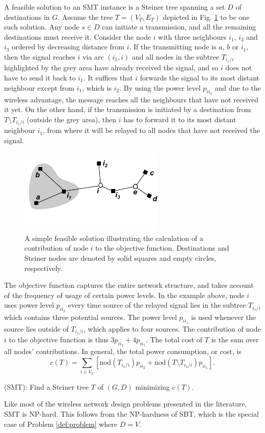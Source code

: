 A feasible solution to an SMT instance is a Steiner tree spanning a set $D$ of destinations in $G$. Assume the tree $T=(V_T, E_T)$ depicted in Fig. \ref{fig:objexp} to be one such solution. Any node $s\in D$ can initiate a transmission, and all the remaining destinations must receive it. Consider the node $i$ with three neighbours $i_1$, $i_2$ and $i_3$ ordered by decreasing distance from $i$. If the transmitting node is $a$, $b$ or $i_1$, then the signal reaches $i$ via arc $(i_1,i)$ and all nodes in the subtree $T_{i_1/i}$ highlighted by the grey area have already received the signal, and so $i$ does not have to send it back to $i_1$. It suffices that $i$ forwards the signal to its most distant neighbour except from $i_1$, which is $i_2$. By using the power level $p_{ii_2}$ and due to the wireless advantage, the message reaches all the neighbours that have not received it yet. On the other hand, if the transmission is initiated by a destination from $T\setminus T_{i_1/i}$ (outside the grey area), then $i$ has to forward it to its most distant neighbour $i_1$, from where it will be relayed to all nodes that have not received the signal.
\begin{figure}[h!]
        \centering
        \includegraphics[height=1.6in]{objexp}
        \caption{A simple feasible solution illustrating the calculation of a contribution of node $i$ to the objective function. Destinations and Steiner nodes are denoted by solid squares and empty circles, respectively.}
                \label{fig:objexp}
\end{figure}

 The objective function captures the entire network structure, and takes account of the  frequency of usage of certain power levels. In the example above, node $i$ uses power level $p_{ii_2}$ every time source of the relayed signal lies in the subtree $T_{i_1/i}$ which contains three potential sources. The power level $p_{ii_1}$ is used  whenever the source lies outside of $T_{i_1/i}$, which applies to four sources. The contribution of node $i$ to the objective function is thus $3p_{ii_2} + 4p_{ii_1}$. The total cost of $T$ is the sum over all nodes' contributions. In general, the total power consumption, or cost, is
$$
c(T) = \sum\limits_{i\in V_T}\left[\text{nod}(T_{i_1/i})p_{ii_2} + \text{nod}(T\setminus T_{i_1/i})p_{ii_1}\right].
$$ 
\begin{problem}\label{def:problem}
(SMT): Find a Steiner tree $T$ of $(G,D)$ minimizing $c(T)$.
\end{problem}
Like most of the wireless network design problems presented in the literature, SMT is NP-hard. This follows from the NP-hardness of SBT\cite{Papadimitriou06SBT}, which is the special case of Problem \ref{def:problem} where $D=V$.


